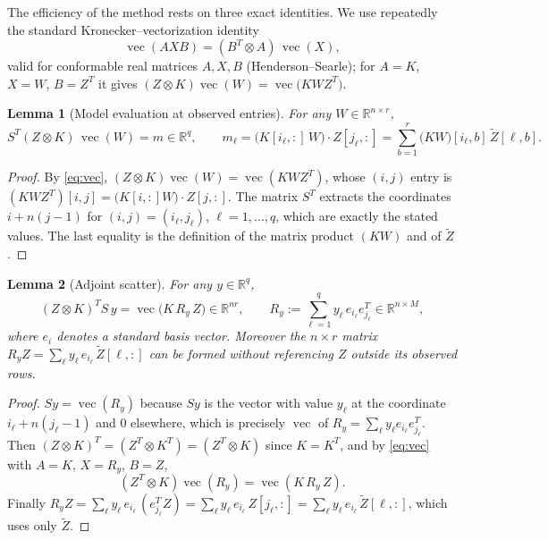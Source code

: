 \documentclass[12pt]{article}
\DeclareMathOperator{\vecop}{vec}
\newcommand{\bR}{\mathbb{R}}
\newcommand{\tZ}{\tilde Z}
\newtheorem{lemma}{Lemma}
\begin{document}
The efficiency of the method rests on three exact identities. We use repeatedly the
standard Kronecker--vectorization identity
\begin{equation}\label{eq:vec}
  \vecop(AXB)=(B^{T}\otimes A)\,\vecop(X),
\end{equation}
valid for conformable real matrices $A,X,B$ (Henderson--Searle); for $A=K$, $X=W$,
$B=Z^{T}$ it gives $(Z\otimes K)\vecop(W)=\vecop\!\big(KWZ^{T}\big)$.

\begin{lemma}[Model evaluation at observed entries]\label{lem:model}
For any $W\in\bR^{n\times r}$,
\[
  S^{T}(Z\otimes K)\,\vecop(W)=m\in\bR^{q},
  \qquad
  m_\ell=\big(K[i_\ell,:]\,W\big)\cdot Z[j_\ell,:]
        =\sum_{b=1}^{r}\big(KW\big)[i_\ell,b]\,\tZ[\ell,b].
\]
\end{lemma}
\begin{proof}
By \eqref{eq:vec}, $(Z\otimes K)\vecop(W)=\vecop(KWZ^{T})$, whose $(i,j)$ entry is
$(KWZ^{T})[i,j]=\big(K[i,:]W\big)\cdot Z[j,:]$. The matrix $S^{T}$ extracts the
coordinates $i+n(j-1)$ for $(i,j)=(i_\ell,j_\ell)$, $\ell=1,\dots,q$, which are
exactly the stated values. The last equality is the definition of the matrix product
$(KW)$ and of $\tZ$.
\end{proof}

\begin{lemma}[Adjoint scatter]\label{lem:adjoint}
For any $y\in\bR^{q}$,
\[
  (Z\otimes K)^{T}S\,y=\vecop\!\big(K\,R_y\,Z\big)\in\bR^{nr},
  \qquad
  R_y:=\sum_{\ell=1}^{q}y_\ell\,e_{i_\ell}e_{j_\ell}^{T}\in\bR^{n\times M},
\]
where $e_i$ denotes a standard basis vector. Moreover the $n\times r$ matrix
$R_yZ=\sum_{\ell}y_\ell\,e_{i_\ell}\,\tZ[\ell,:]$ can be formed without referencing
$Z$ outside its observed rows.
\end{lemma}
\begin{proof}
$Sy=\vecop(R_y)$ because $Sy$ is the vector with value $y_\ell$ at the coordinate
$i_\ell+n(j_\ell-1)$ and $0$ elsewhere, which is precisely $\vecop$ of
$R_y=\sum_\ell y_\ell e_{i_\ell}e_{j_\ell}^{T}$. Then
$(Z\otimes K)^{T}=(Z^{T}\otimes K^{T})=(Z^{T}\otimes K)$ since $K=K^{T}$, and by
\eqref{eq:vec} with $A=K$, $X=R_y$, $B=Z$,
\[
  (Z^{T}\otimes K)\vecop(R_y)=\vecop(K\,R_y\,Z).
\]
Finally $R_yZ=\sum_\ell y_\ell\,e_{i_\ell}\,(e_{j_\ell}^{T}Z)
=\sum_\ell y_\ell\,e_{i_\ell}\,Z[j_\ell,:]=\sum_\ell y_\ell\,e_{i_\ell}\,\tZ[\ell,:]$,
which uses only $\tZ$.
\end{proof}
\end{document}
